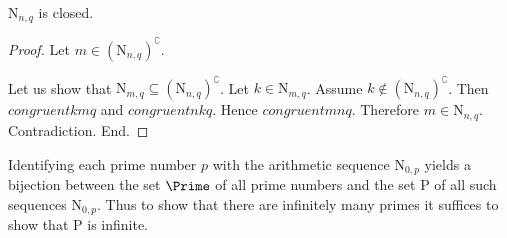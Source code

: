 \documentclass{stex}
\let\oldcomplement\complement
\renewcommand{\complement}[1]{\left(#1\right)^{\oldcomplement}}
\newcommand{\arithseq}[2]{\mathrm{N}_{#1,#2}}
\newcommand{\Ps}{\mathrm{P}}
\begin{document}
  \begin{forthel}
    \begin{lemma}
      $\arithseq{n}{q}$ is closed.
    \end{lemma}
    \begin{proof}
      Let $m \in \complement{\arithseq{n}{q}}$.

      Let us show that $\arithseq{m}{q} \subseteq \complement{\arithseq{n}{q}}$.
        Let $k \in \arithseq{m}{q}$.
        Assume $k \notin \complement{\arithseq{n}{q}}$.
        Then $congruent{k}{m}{q}$ and $congruent{n}{k}{q}$.
        Hence $congruent{m}{n}{q}$.
        Therefore $m \in \arithseq{n}{q}$.
        Contradiction.
      End.
    \end{proof}
  \end{forthel}

  Identifying each prime number $p$ with the arithmetic sequence $\arithseq{0}{p}$
  yields a bijection between the set $\Prime$ of all prime numbers and the set
  $\Ps$ of all such sequences $\arithseq{0}{p}$.
  Thus to show that there are infinitely many primes it suffices to show that
  $\Ps$ is infinite.
\end{document}
